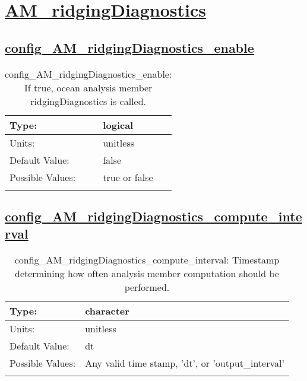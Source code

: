 \section[AM\_ridgingDiagnostics]{\hyperref[sec:nm_tab_AM_ridgingDiagnostics]{AM\_ridgingDiagnostics}}
\label{sec:nm_sec_AM_ridgingDiagnostics}
\subsection[config\_AM\_ridgingDiagnostics\_enable]{\hyperref[sec:nm_tab_AM_ridgingDiagnostics]{config\_AM\_ridgingDiagnostics\_enable}}
\label{subsec:nm_sec_config_AM_ridgingDiagnostics_enable}
\begin{center}
\begin{longtable}{| p{2.0in} || p{4.0in} |}
    \hline
    Type: & logical \\
    \hline
    Units: & \si{unitless} \\
    \hline
    Default Value: & false \\
    \hline
    Possible Values: & true or false \\
    \hline
    \caption{config\_AM\_ridgingDiagnostics\_enable: If true, ocean analysis member ridgingDiagnostics is called.}
\end{longtable}
\end{center}
\subsection[config\_AM\_ridgingDiagnostics\_compute\_interval]{\hyperref[sec:nm_tab_AM_ridgingDiagnostics]{config\_AM\_ridgingDiagnostics\_compute\_interval}}
\label{subsec:nm_sec_config_AM_ridgingDiagnostics_compute_interval}
\begin{center}
\begin{longtable}{| p{2.0in} || p{4.0in} |}
    \hline
    Type: & character \\
    \hline
    Units: & \si{unitless} \\
    \hline
    Default Value: & dt \\
    \hline
    Possible Values: & Any valid time stamp, 'dt', or 'output\_interval' \\
    \hline
    \caption{config\_AM\_ridgingDiagnostics\_compute\_interval: Timestamp determining how often analysis member computation should be performed.}
\end{longtable}
\end{center}
